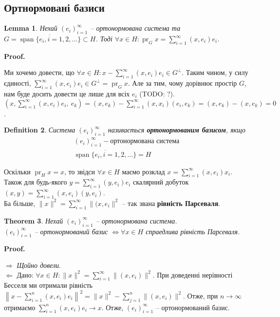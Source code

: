 \documentclass[a4paper, 10pt]{article}
\makeatletter
\def\rightproof{$\boxed{\Rightarrow}$ }
\def\leftproof{$\boxed{\Leftarrow}$ }
\theoremstyle{theoremdd}
\newtheorem{theorem}{Theorem}[subsection]
\theoremstyle{theoremdd}
\newtheorem{definition}[theorem]{Definition}
\theoremstyle{theoremdd}
\theoremstyle{theoremdd}
\theoremstyle{theoremdd}
\theoremstyle{theoremdd}
\theoremstyle{theoremdd}
\newtheorem{lemma}[theorem]{Lemma}
\theoremstyle{theoremdd}
\DeclareMathOperator{\pr}{pr}
\renewenvironment{proof}[1][Proof.\\]{\par
\pushQED{\hfill \qed}%
\normalfont \topsep6\p@\@plus6\p@\relax
\trivlist
\item\relax
{\bfseries
#1\@addpunct{.}}\hspace\labelsep\ignorespaces
}{%
\popQED\endtrivlist\@endpefalse
}
\DeclareMathOperator{\linspan}{span}
\makeatother
\begin{document}
\subsection{Ортнормовані базиси}
\begin{lemma}
Нехай $(e_i)_{i=1}^\infty$ -- ортонормована система та $G = \overline{\linspan\{e_i,i = 1,2,\dots\}} \subset H$. Тоді $\forall x \in H: \pr_G x = \displaystyle\sum_{i=1}^\infty (x,e_i)e_i$.
\end{lemma}

\begin{proof}
Ми хочемо довести, що $\forall x \in H: x - \displaystyle\sum_{i=1}^\infty (x,e_i)e_i \in G^\perp$. Таким чином, у силу єдиності, $\displaystyle\sum_{i=1}^\infty (x,e_i)e_i \in G^\perp = \pr_G x$. Але за тим, чому дорівнює простір $G$, нам буде досить довести це лише для всіх $e_i$ (TODO: ?).\\
$\displaystyle\left(x, \sum_{i=1}^\infty (x,e_i)e_i,\ e_k\right) = (x,e_k) - \sum_{i=1}^\infty (x,x_i)(e_i,e_k) = (x,e_k) - (x,e_k) = 0$.
\end{proof}

\begin{definition}
Система $(e_i)_{i=1}^\infty$ називається \textbf{ортонормованим базисом}, якщо
\begin{align*}
(e_i)_{i=1}^\infty - \text{ортонормована система} \\
\overline{\linspan\{e_i,i = 1,2,\dots\}} = H
\end{align*}
\end{definition}
\noindent
Оскільки $\pr_H x = x$, то звідси $\forall x \in H$ маємо розклад $x = \displaystyle\sum_{i=1}^\infty (x,e_i)x_i$.\\
Також для будь-якого $y = \displaystyle\sum_{i=1}^\infty (y,e_i)e_i$ скалярний добуток $(x,y) = \displaystyle\sum_{i=1}^\infty (x,e_i)\overline{(y,e_i)}$.\\
Ба більше, $\|x\|^2 = \displaystyle\sum_{i=1}^\infty \|(x,e_i\|^2$ -- так звана \textbf{рівність Парсеваля}.

\begin{theorem}
Нехай $(e_i)_{i=1}^\infty$ -- ортонормована система.\\
$(e_i)_{i=1}^\infty$ -- ортонормований базис $\iff \forall x \in H$ спраедлива рівність Парсеваля.
\end{theorem}

\begin{proof}
\rightproof \textit{Щойно довели}.
\bigskip \\
\leftproof Дано: $\forall x \in H: \|x\|^2 = \displaystyle\sum_{i=1}^\infty \|(x,e_i)\|^2$. При доведенні нерівності Бесселя ми отримали рівність $\displaystyle\left\| x - \sum_{i=1}^n (x,e_i)e_i \right\|^2 = \|x\|^2 - \sum_{j=1}^n \|(x,e_i)\|^2$. Отже, при $n \to \infty$ отримаємо $\displaystyle\sum_{i=1}^n (x,e_i)e_i \to x$. Отже, $(e_i)_{i=1}^\infty$ -- ортонормований базис.
\end{proof}
\end{document}
